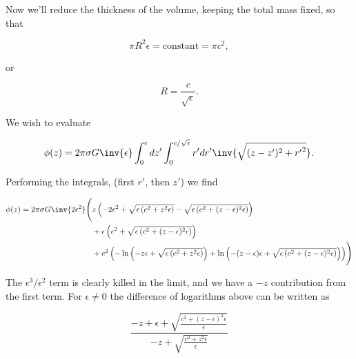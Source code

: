 Now we'll reduce the thickness of the volume, keeping the total mass fixed, so that

\begin{equation}\label{eqn:infiniteSheetPotentials:450}
\pi R^2 \epsilon = \text{constant} = \pi c^2,
\end{equation}

or

\begin{equation}\label{eqn:infiniteSheetPotentials:470}
R = \frac{c}{\sqrt{\epsilon}}.
\end{equation}

We wish to evaluate

\begin{equation}\label{eqn:infiniteSheetPotentials:490}
\phi(z) 
= 
2 \pi \sigma G 
\inv{\epsilon} 
\int_0^\epsilon dz' \int_0^{c/\sqrt{\epsilon}} r' dr' \inv{\sqrt{(z-z')^2 + {r'}^2}}.
\end{equation}

Performing the integrals, (first $r'$, then $z'$) we find

\begin{equation}\label{eqn:infiniteSheetPotentials:510}
\begin{aligned}
\phi(z) = 2 \pi \sigma G \inv{2 \epsilon^2}
\Biggl(
&z \left(-2 \epsilon ^2+\sqrt{\epsilon  \left(c^2+z^2 \epsilon \right)}-\sqrt{\epsilon  \left(c^2+(z-\epsilon )^2 \epsilon \right)}\right) \\
&+\epsilon  \left(\epsilon ^2+\sqrt{\epsilon  \left(c^2+(z-\epsilon )^2 \epsilon \right)}\right) \\
&+c^2 \left(-\ln \left(-z \epsilon +\sqrt{\epsilon  \left(c^2+z^2 \epsilon \right)}\right)+\ln \left(-(z - \epsilon) \epsilon +\sqrt{\epsilon  \left(c^2+(z-\epsilon )^2 \epsilon \right)}\right)\right)
\Biggr)
\end{aligned}
\end{equation}

The $\epsilon^3/\epsilon^2$ term is clearly killed in the limit, and we have a $-z$ contribution from the first term.  For $\epsilon \ne 0$ the difference of logarithms above can be written as

\begin{equation}\label{eqn:infiniteSheetPotentials:530}
\frac{-z+\epsilon +\sqrt{\frac{c^2+(z-\epsilon )^2 \epsilon }{\epsilon }}}{-z+\sqrt{\frac{c^2+z^2 \epsilon }{\epsilon }}}
\end{equation}

